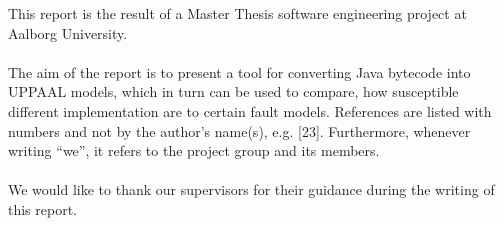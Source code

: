 This report is the result of a Master Thesis software engineering project at Aalborg University.\\\\

\noindent The aim of the report is to present a tool for converting Java bytecode into UPPAAL models, which in turn can be used to compare, how susceptible different implementation are to certain fault models. References are listed with numbers and not by the author’s name(s), e.g. [23]. Furthermore, whenever writing “we”, it refers to the project group and its members.\\\\

\noindent We would like to thank our supervisors for their guidance during the writing of this
report.

\afterpage{\null\newpage}
